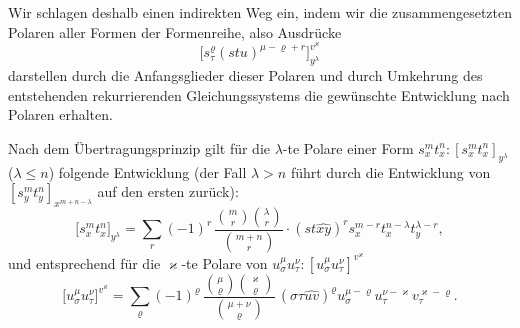 Wir schlagen deshalb einen indirekten Weg ein, indem wir die zusammengesetzten Polaren aller Formen der Formenreihe, also Ausdrücke
\[
\bigl[s_\tau^\varrho(stu)^{\mu-\varrho+r}\bigr]_{y^\lambda}^{v^\varkappa}
\]
darstellen durch die Anfangsglieder dieser Polaren und durch Umkehrung des entstehenden rekurrierenden Gleichungssystems die gewünschte Entwicklung nach Polaren erhalten.

Nach dem Übertragungsprinzip gilt für die $\lambda$-te Polare einer Form $s_x^m t_x^n:[s_x^m t_x^n]_{y^\lambda}$ ($\lambda\le n$) folgende Entwicklung (der Fall $\lambda>n$ führt durch die Entwicklung von $[s_y^m t_y^n]_{x^{m+n-\lambda}}$ auf den ersten zurück):
\[
\bigl[s_x^m t_x^n\bigr]_{y^\lambda}
=\sum_r (-1)^r\,
\frac{\binom{m}{r}\binom{\lambda}{r}}{\binom{m+n}{r}}\cdot
(st\widehat{xy})^r s_x^{m-r}t_x^{n-\lambda}t_y^{\lambda-r},
\]
und entsprechend für die $\varkappa$-te Polare von $u_\sigma^\mu u_\tau^\nu:[u_\sigma^\mu u_\tau^\nu]^{v^\varkappa}$
\[
\bigl[u_\sigma^\mu u_\tau^\nu\bigr]^{v^\varkappa}
=\sum_\varrho (-1)^\varrho\,
\frac{\binom{\mu}{\varrho}\binom{\varkappa}{\varrho}}{\binom{\mu+\nu}{\varrho}}\,
(\sigma\tau\widehat{uv})^\varrho u_\sigma^{\mu-\varrho}u_\tau^{\nu-\varkappa}v_\tau^{\varkappa-\varrho}.
\]

